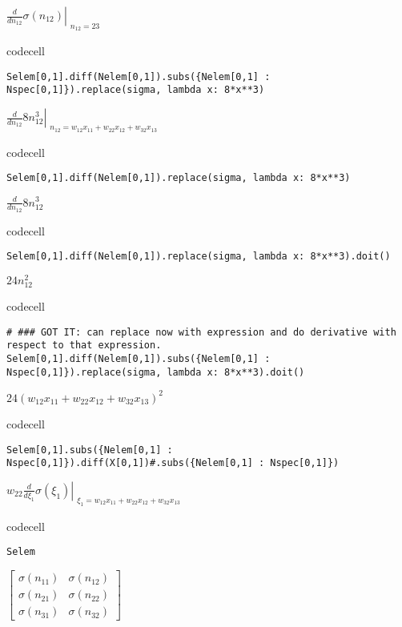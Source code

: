 $\displaystyle \left. \frac{d}{d n_{12}} \sigma{\left(n_{12} \right)} \right|_{\substack{ n_{12}=23 }}$

codecell

\begin{verbatim}
Selem[0,1].diff(Nelem[0,1]).subs({Nelem[0,1] : Nspec[0,1]}).replace(sigma, lambda x: 8*x**3)
\end{verbatim}

$\displaystyle \left. \frac{d}{d n_{12}} 8 n_{12}^{3} \right|_{\substack{ n_{12}=w_{12} x_{11} + w_{22} x_{12} + w_{32} x_{13} }}$

codecell

\begin{verbatim}
Selem[0,1].diff(Nelem[0,1]).replace(sigma, lambda x: 8*x**3)
\end{verbatim}

$\displaystyle \frac{d}{d n_{12}} 8 n_{12}^{3}$

codecell

\begin{verbatim}
Selem[0,1].diff(Nelem[0,1]).replace(sigma, lambda x: 8*x**3).doit()
\end{verbatim}

$\displaystyle 24 n_{12}^{2}$

codecell

\begin{verbatim}
# ### GOT IT: can replace now with expression and do derivative with respect to that expression.
Selem[0,1].diff(Nelem[0,1]).subs({Nelem[0,1] : Nspec[0,1]}).replace(sigma, lambda x: 8*x**3).doit()
\end{verbatim}

$\displaystyle 24 \left(w_{12} x_{11} + w_{22} x_{12} + w_{32} x_{13}\right)^{2}$

codecell

\begin{verbatim}
Selem[0,1].subs({Nelem[0,1] : Nspec[0,1]}).diff(X[0,1])#.subs({Nelem[0,1] : Nspec[0,1]})
\end{verbatim}

$\displaystyle w_{22} \left. \frac{d}{d \xi_{1}} \sigma{\left(\xi_{1} \right)} \right|_{\substack{ \xi_{1}=w_{12} x_{11} + w_{22} x_{12} + w_{32} x_{13} }}$

codecell

\begin{verbatim}
Selem
\end{verbatim}

$\displaystyle \left[\begin{matrix}\sigma{\left(n_{11} \right)} & \sigma{\left(n_{12} \right)}\\\sigma{\left(n_{21} \right)} & \sigma{\left(n_{22} \right)}\\\sigma{\left(n_{31} \right)} & \sigma{\left(n_{32} \right)}\end{matrix}\right]$

